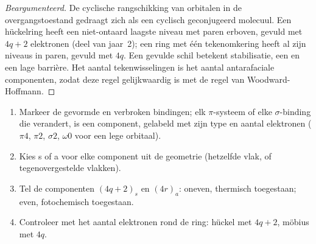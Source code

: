 \begin{proof}[Beargumenteerd]
De cyclische rangschikking van orbitalen in de overgangstoestand gedraagt
zich als een cyclisch geconjugeerd molecuul. Een hückelring heeft een
niet-ontaard laagste niveau met paren
erboven, gevuld met $4q + 2$ elektronen (deel van jaar~2); een ring met één
tekenomkering heeft al zijn niveaus in paren, gevuld met $4q$. Een gevulde schil
betekent stabilisatie, een  en een lage
barrière. Het aantal tekenwisselingen is het aantal antarafaciale
componenten, zodat deze regel gelijkwaardig is met de regel van
Woodward-Hoffmann.
\end{proof}

\begin{method}\label{met:b3:pericyclic:components}
\begin{enumerate}
  \item Markeer de gevormde en verbroken bindingen; elk $\pi$-systeem of elke $\sigma$-binding die verandert, is een
        component, gelabeld met zijn type en aantal elektronen ($\pi4$, $\pi2$, $\sigma2$, $\omega0$ voor
        een lege orbitaal).
  \item Kies s of a voor elke component uit de geometrie (hetzelfde vlak,
        of tegenovergestelde vlakken).
  \item Tel de componenten $(4q + 2)_s$ en $(4r)_a$: oneven, thermisch toegestaan; even,
        fotochemisch toegestaan.
  \item Controleer met het aantal elektronen rond de ring: hückel met $4q + 2$,
        möbius met $4q$.
\end{enumerate}
\end{method}

